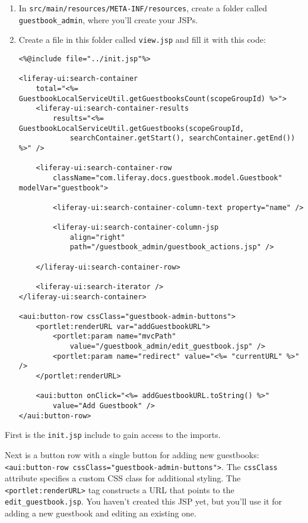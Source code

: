 \begin{enumerate}
\def\labelenumi{\arabic{enumi}.}
\item
  In \texttt{src/main/resources/META-INF/resources}, create a folder
  called \texttt{guestbook\_admin}, where you'll create your JSPs.
\item
  Create a file in this folder called \texttt{view.jsp} and fill it with
  this code:

\begin{verbatim}
<%@include file="../init.jsp"%>

<liferay-ui:search-container
    total="<%= GuestbookLocalServiceUtil.getGuestbooksCount(scopeGroupId) %>">
    <liferay-ui:search-container-results
        results="<%= GuestbookLocalServiceUtil.getGuestbooks(scopeGroupId, 
            searchContainer.getStart(), searchContainer.getEnd()) %>" />

    <liferay-ui:search-container-row
        className="com.liferay.docs.guestbook.model.Guestbook" modelVar="guestbook">

        <liferay-ui:search-container-column-text property="name" />

        <liferay-ui:search-container-column-jsp
            align="right" 
            path="/guestbook_admin/guestbook_actions.jsp" />

    </liferay-ui:search-container-row>

    <liferay-ui:search-iterator />
</liferay-ui:search-container>

<aui:button-row cssClass="guestbook-admin-buttons">
    <portlet:renderURL var="addGuestbookURL">
        <portlet:param name="mvcPath"
            value="/guestbook_admin/edit_guestbook.jsp" />
        <portlet:param name="redirect" value="<%= "currentURL" %>" />
    </portlet:renderURL>

    <aui:button onClick="<%= addGuestbookURL.toString() %>"
        value="Add Guestbook" />
</aui:button-row>
\end{verbatim}
\end{enumerate}

First is the \texttt{init.jsp} include to gain access to the imports.

Next is a button row with a single button for adding new guestbooks:
\texttt{\textless{}aui:button-row\ cssClass="guestbook-admin-buttons"\textgreater{}}.
The \texttt{cssClass} attribute specifies a custom CSS class for
additional styling. The
\texttt{\textless{}portlet:renderURL\textgreater{}} tag constructs a URL
that points to the \texttt{edit\_guestbook.jsp}. You haven't created
this JSP yet, but you'll use it for adding a new guestbook and editing
an existing one.


